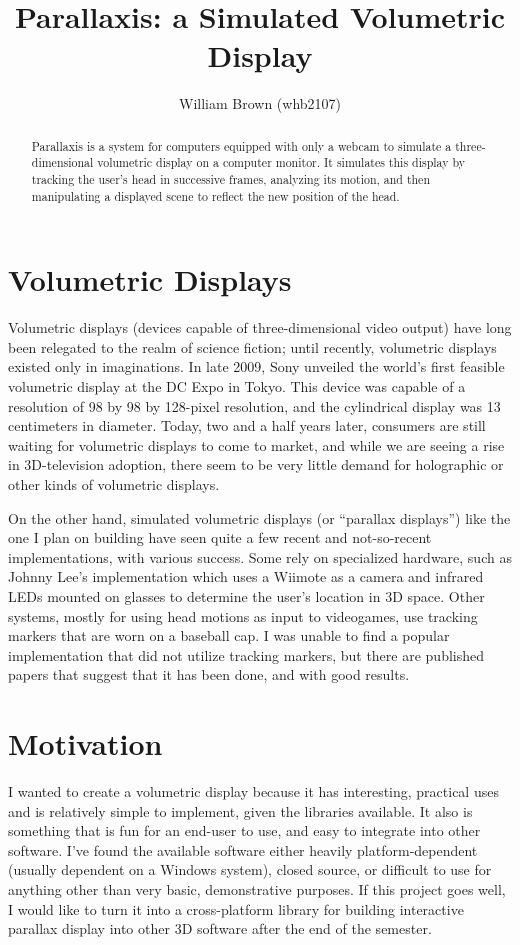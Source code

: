 \documentclass[letterpaper]{article}
\author{William Brown (whb2107)}
\title{Parallaxis: a Simulated Volumetric Display}
\begin{document}
\maketitle

\begin{abstract}
  Parallaxis is a system for computers equipped with only a webcam to
  simulate a three-dimensional volumetric display on a computer
  monitor. It simulates this display by tracking the user's head in
  successive frames, analyzing its motion, and then manipulating a
  displayed scene to reflect the new position of the head.
\end{abstract}

\tableofcontents

\section{Volumetric Displays}
Volumetric displays (devices capable of three-dimensional video
output) have long been relegated to the realm of science fiction;
until recently, volumetric displays existed only in imaginations. In
late 2009, Sony unveiled the world's first feasible volumetric display
at the DC Expo in Tokyo. This device was capable
of a resolution of 98 by 98 by 128-pixel resolution, and the
cylindrical display was 13 centimeters in diameter. Today, two and a
half years later, consumers are still waiting for volumetric displays
to come to market, and while we are seeing a rise in 3D-television
adoption, there seem to be very little demand for holographic or other
kinds of volumetric displays.

On the other hand, simulated volumetric displays (or ``parallax
displays'') like the one I plan on building have seen quite a few
recent and not-so-recent implementations, with various success. Some
rely on specialized hardware, such as Johnny Lee's implementation
which uses a Wiimote as a camera and infrared LEDs mounted on glasses
to determine the user's location in 3D space. Other
systems, mostly for using head motions as input to videogames, use
tracking markers that are worn on a baseball cap. I was unable to find
a popular implementation that did not utilize tracking markers, but
there are published papers that suggest that it has been done, and
with good results. 

\section{Motivation}
I wanted to create a volumetric display because it has interesting,
practical uses and is relatively simple to implement, given the
libraries available. It also is something that is fun for an end-user
to use, and easy to integrate into other software. I've found the
available software either heavily platform-dependent (usually
dependent on a Windows system), closed source, or difficult to use for
anything other than very basic, demonstrative purposes. If this
project goes well, I would like to turn it into a cross-platform
library for building interactive parallax display into other 3D
software after the end of the semester.
\end{document}
